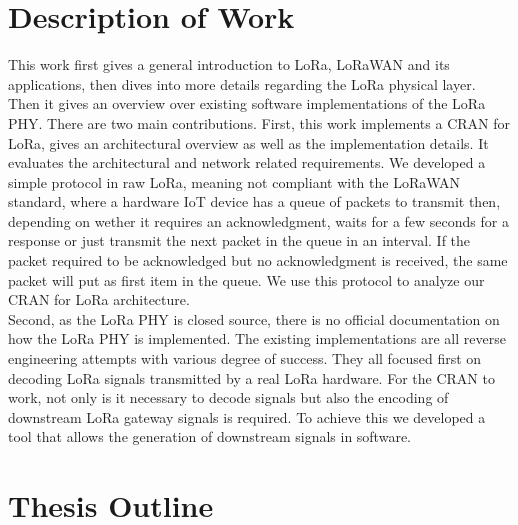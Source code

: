 \section{Description of Work}
This work first gives a general introduction to LoRa, LoRaWAN and its applications, then dives 
into more details regarding the LoRa physical layer. Then it gives an overview over existing 
software implementations of the LoRa PHY. There are two main contributions. First, this work 
implements a CRAN for LoRa, gives an architectural overview as well as the implementation details.
It evaluates the architectural and network related requirements. We developed a simple protocol in raw LoRa,
meaning not compliant with the LoRaWAN standard, where a hardware IoT device has a queue of packets to transmit then, depending on 
wether it requires an acknowledgment, waits for a few seconds for a response or just transmit the next packet in the queue in an interval.
If the packet required to be acknowledged but no acknowledgment is received, the same packet will put as first item in the queue.
We use this protocol to analyze our CRAN for LoRa architecture.
\\
Second, as the LoRa PHY is closed source, there is no official documentation on how the LoRa PHY is implemented.
The existing implementations are all reverse engineering attempts with various degree of success. 
They all focused first on decoding LoRa signals transmitted by a real LoRa hardware. For the CRAN to work, not only is it 
necessary to decode signals but also the encoding of downstream LoRa gateway signals is required. To achieve this we developed a tool 
that allows the generation of downstream signals in software.


\section{Thesis Outline}

